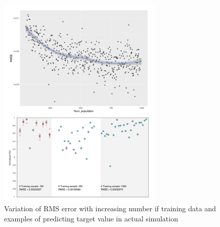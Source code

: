   \begin{figure}[ht]
    \centering
    \includegraphics[width=0.7\textwidth]{figures/pdf/Figure_ANN_num_training_data_sens.pdf}
    \caption{Variation of RMS error with increasing number if training data and examples of predicting target value in actual simulation}
    \label{fig:Figure_ANN_num_training_data_sens}
\end{figure}



